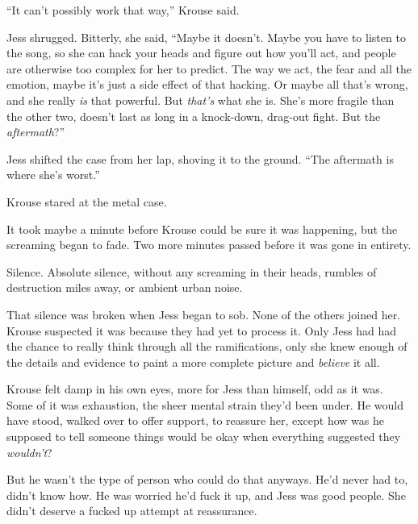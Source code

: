 ``It can't possibly work that way,'' Krouse said.



Jess shrugged.  Bitterly, she said, ``Maybe it doesn't.  Maybe you have to listen to the song, so she can hack your heads and figure out how you'll act, and people are otherwise too complex for her to predict.  The way we act, the fear and all the emotion, maybe it's just a side effect of that hacking.  Or maybe all that's wrong, and she really \emph{is} that powerful.  But \emph{that's} what she is.  She's more fragile than the other two, doesn't last as long in a knock-down, drag-out fight.  But the \emph{aftermath}?''



Jess shifted the case from her lap, shoving it to the ground.  ``The aftermath is where she's worst.''



Krouse stared at the metal case.



It took maybe a minute before Krouse could be sure it was happening, but the screaming began to fade.  Two more minutes passed before it was gone in entirety.



Silence.  Absolute silence, without any screaming in their heads, rumbles of destruction miles away, or ambient urban noise.



That silence was broken when Jess began to sob.  None of the others joined her.  Krouse suspected it was because they had yet to process it.  Only Jess had had the chance to really think through all the ramifications, only she knew enough of the details and evidence to paint a more complete picture and \emph{believe} it all.



Krouse felt damp in his own eyes, more for Jess than himself, odd as it was.  Some of it was exhaustion, the sheer mental strain they'd been under.  He would have stood, walked over to offer support, to reassure her, except how was he supposed to tell someone things would be okay when everything suggested they \emph{wouldn't}?



But he wasn't the type of person who could do that anyways.  He'd never had to, didn't know how.  He was worried he'd fuck it up, and Jess was good people.  She didn't deserve a fucked up attempt at reassurance.



